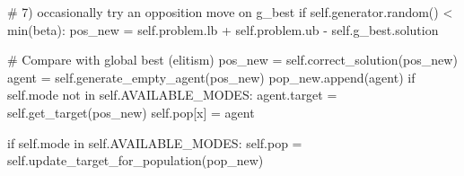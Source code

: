             # 7) occasionally try an opposition move on g_best
            if self.generator.random() < min(beta):
                pos_new = self.problem.lb + self.problem.ub - self.g_best.solution


                    # Compare with global best (elitism)
            pos_new = self.correct_solution(pos_new)
            agent = self.generate_empty_agent(pos_new)
            pop_new.append(agent)
            if self.mode not in self.AVAILABLE_MODES:
                agent.target = self.get_target(pos_new)
                self.pop[x] = agent

        if self.mode in self.AVAILABLE_MODES:
            self.pop = self.update_target_for_population(pop_new)
